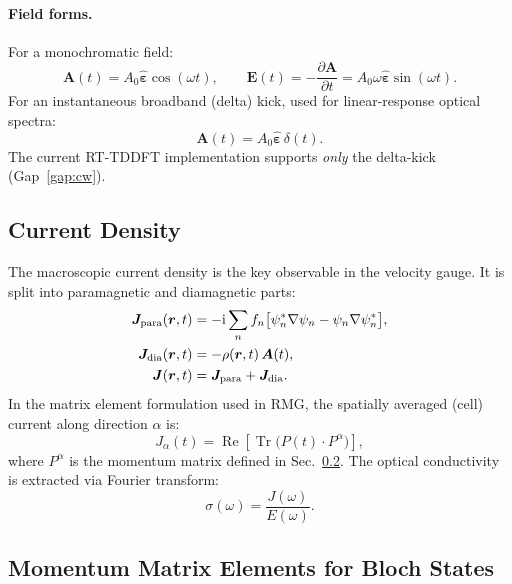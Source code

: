 \documentclass[12pt,letterpaper]{article}
\newcommand{\ii}{\mathrm{i}}
\begin{document}
\paragraph{Field forms.}
For a monochromatic field:
\begin{equation}
  \bm{A}(t) = A_0\hat{\bm{\varepsilon}}\cos(\omega t),
  \qquad
  \bm{E}(t) = -\frac{\partial\bm{A}}{\partial t} = A_0\omega\hat{\bm{\varepsilon}}\sin(\omega t).
\end{equation}
For an instantaneous broadband (delta) kick, used for linear-response optical
spectra:
\begin{equation}
  \bm{A}(t) = A_0\hat{\bm{\varepsilon}}\,\delta(t).
  \label{eq:delta_kick}
\end{equation}
The current RT-TDDFT implementation supports \emph{only} the delta-kick
(Gap~\ref{gap:cw}).

\subsection{Current Density}
\label{sec:current}

The macroscopic current density is the key observable in the velocity gauge.
It is split into paramagnetic and diamagnetic parts:
\begin{align}
  \bm{J}_{\rm para}(\bm{r},t) &= -\ii\sum_n f_n
    \bigl[\psi_n^*\nabla\psi_n - \psi_n\nabla\psi_n^*\bigr], \label{eq:jpara}\\
  \bm{J}_{\rm dia}(\bm{r},t) &= -\rho(\bm{r},t)\,\bm{A}(t), \label{eq:jdia}\\
  \bm{J}(\bm{r},t) &= \bm{J}_{\rm para} + \bm{J}_{\rm dia}. \label{eq:jtot}
\end{align}
In the matrix element formulation used in RMG, the spatially averaged (cell)
current along direction $\alpha$ is:
\begin{equation}
  J_\alpha(t) = \operatorname{Re}\!\left[\operatorname{Tr}\bigl(P(t)\cdot P^\alpha\bigr)\right],
  \label{eq:current_trace}
\end{equation}
where $P^\alpha$ is the momentum matrix defined in Sec.~\ref{sec:momentum}.
The optical conductivity is extracted via Fourier transform:
\begin{equation}
  \sigma(\omega) = \frac{J(\omega)}{E(\omega)}.
\end{equation}

\subsection{Momentum Matrix Elements for Bloch States}
\label{sec:momentum}
\end{document}
